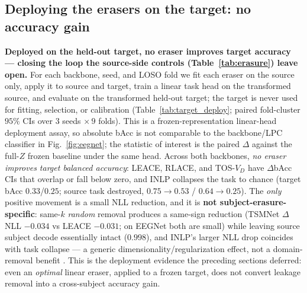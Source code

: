 

\subsection{Deploying the erasers on the target: no accuracy gain}
\textbf{Deployed on the held-out target, no eraser improves target accuracy --- closing the loop the
source-side controls (Table~\ref{tab:erasure}) leave open.} For each backbone, seed, and LOSO fold we fit each
eraser on the source only, apply it to source and target, train a linear task head on the transformed source,
and evaluate on the transformed held-out target; the target is never used for fitting, selection, or
calibration (Table~\ref{tab:target_deploy}; paired fold-cluster $95\%$ CIs over $3$ seeds $\times\,9$ folds).
This is a frozen-representation linear-head deployment assay, so absolute bAcc is not comparable to the
backbone/LPC classifier in Fig.~\ref{fig:eegnet}; the statistic of interest is the paired $\Delta$ against the
full-$Z$ frozen baseline under the same head. Across both backbones, \emph{no eraser improves target balanced accuracy}: LEACE, RLACE, and TOS-$V_D$ have
$\Delta$bAcc CIs that overlap or fall below zero, and INLP collapses the task to chance (target bAcc
$0.33$/$0.25$; source task destroyed, $0.75\to0.53$ / $0.64\to0.25$). The \emph{only} positive movement is a
small NLL reduction, and it is \textbf{not subject-erasure-specific}: same-$k$ \emph{random} removal produces a
same-sign reduction (TSMNet $\Delta$NLL $-0.034$ vs LEACE $-0.031$; on EEGNet both are small) while leaving
source subject decode essentially intact ($0.998$), and INLP's larger NLL drop coincides with task collapse ---
a generic dimensionality/regularization effect, not a domain-removal benefit . This
is the deployment evidence the preceding sections deferred: even an \emph{optimal} linear eraser, applied to a
frozen target, does not convert leakage removal into a cross-subject accuracy gain.



